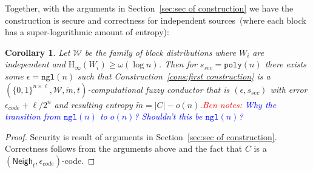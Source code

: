 \documentclass[11pt]{article}
\newcommand{\secref}[1]{\mbox{Section~\ref{#1}}}
\newcommand{\lemref}[1]{\mbox{Lemma~\ref{#1}}}
\newcommand{\consref}[1]{\mbox{Construction~\ref{#1}}}
\DeclareMathOperator*{\expe}{\mathbb{E}}
\newcommand{\class}[1]{{\ensuremath{\mathsf{#1}}}}
\newcommand{\zo}{\ensuremath{\{0, 1\}}}
\newcommand{\neigh}{\ensuremath{\class{Neigh}}\xspace}
\newcommand{\dis}{\ensuremath{\mathsf{dis}}}
\newcommand{\poly}{\ensuremath{\mathtt{poly}}\xspace}
\newcommand{\ngl}{\ensuremath{\mathtt{ngl}}\xspace}
\newcommand{\Hoo}{\mathrm{H}_\infty}
\newtheorem{lemma}[theorem]{Lemma}
\newtheorem{corollary}[theorem]{Corollary}
\newcommand{\authnote}[2]{{\textcolor{red}{\textsf{#1 notes: }\textcolor{blue}{ #2}}\marginpar{\textcolor{red}{\textbf{!!!!!}}}}}
\newcommand{\authnote}[2]{}
\newcommand{\bnote}[1]{{\authnote{Ben}{#1}}}
\begin{document}

Together, with the arguments in \secref{sec:sec of construction} we have the construction is secure and correctness for independent sources~(where each block has a super-logarithmic amount of entropy):
\begin{corollary}
Let $\mathcal{W}$ be the family of block distributions where $W_i$ are independent and $\Hoo(W_i) \geq \omega(\log n)$.  Then for $s_{sec} = \poly(n)$ there exists some $\epsilon=\ngl(n)$ such that \consref{cons:first construction} is a $(\zo^{n\times \ell}, \mathcal{W}, \tilde{m}, t)$-computational fuzzy conductor that is $(\epsilon, s_{sec})$ with error $\epsilon_{code} + \ell/2^n$ and resulting entropy $\tilde{m} = |C| - o(n)$.\bnote{Why the transition from $\ngl(n)$ to $o(n)$?  Shouldn't this be $\ngl(n)$?}
\end{corollary}
\begin{proof}
Security is result of arguments in \secref{sec:sec of construction}.  Correctness follows from the arguments above and the fact that $C$ is a $(\neigh_t, \epsilon_{code})$-code.
\end{proof}
\end{document}
